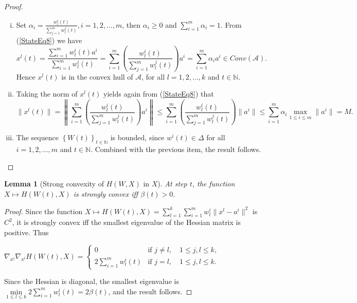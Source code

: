 \documentclass[11pt]{article}
\numberwithin{equation}{section}
\newtheorem{lemma}{Lemma}[proposition]
\begin{document}
\begin{proof}
\begin{enumerate}[(i)]
	\item  Set $\alpha_i = \frac{ w^i_l(t)}{\sum_{j=1}^{m} w^j_l(t)}, i=1, 2, \ldots ,m$, then $\alpha_i \geq 0$ and $\sum\limits_{i=1}^{m} \alpha_i =1$. From (\ref{StateEq8}) we have
	\begin{equation*}
		x^l(t) = \frac{\sum_{i=1}^{m} w^i_l(t) a^i}{\sum_{i=1}^{m} w^i_l(t)} 
		= \sum_{i=1}^{m} \left( \frac{ w^i_l(t)}{\sum_{j=1}^{m} w^j_l(t)} \right) a^i 
		= \sum\limits_{i=1}^{m} \alpha_i a^i \in Conv(\mathcal{A}).
	\end{equation*}
	Hence $x^l(t)$ is in the convex hull of $\mathcal{A}$, for all $l = 1, 2, \ldots, k$ and $t \in \mathbb{N}$.

	\item
	Taking the norm of $x^l(t)$ yields again from (\ref{StateEq8}) that
	\begin{equation*}
		\| x^l(t) \| = \left\lVert \sum_{i=1}^{m} \left( \frac{ w^i_l(t)}{\sum_{j=1}^{m} w^j_l(t)} \right) a^i \right\lVert
		\leq \sum_{i=1}^{m} \left( \frac{ w^i_l(t)}{\sum_{j=1}^{m} w^j_l(t)} \right) \| a^i \|
		\leq \sum_{i=1}^{m} \alpha_i \max\limits_{1 \leq i \leq m} \| a^i \| = M .
	\end{equation*}
	\item The sequence $\left\lbrace W(t) \right\rbrace_{t \in \mathbb{N}}$ is bounded, since $w^i(t) \in \Delta$ for all $i=1, 2, \ldots ,m$ and $t \in \mathbb{N}$. Combined with the previous item, the result follows. 
\end{enumerate}
\end{proof}

\begin{lemma}[Strong convexity of $H(W,X)$ in $X$] \label{StateEq14}
At step $t$, the function $X \mapsto H(W(t),X)$ is strongly convex iff $\beta(t) > 0$.
\end{lemma}

\begin{proof}
Since the function $X \mapsto H(W(t),X) = 
\sum\limits_{l=1}^{k} \sum\limits_{i=1}^{m} w^i_l \|x^l - a^i\|^2$ is $C^2$, it is strongly convex iff the smallest eigenvalue of the Hessian matrix is positive. Thus

\begin{center}
$\nabla_{x^j} \nabla_{x^l} H(W(t),X) = 
\begin{cases} 0 &\mbox{if } j \neq l, \quad 1 \leq j,l \leq k ,
\\ 2\sum\limits_{i=1}^{m} w^i_l(t) &\mbox{if } j = l, \quad 1 \leq j,l \leq k. \end{cases} $
\end{center}

Since the Hessian is diagonal, the smallest eigenvalue is $\min\limits_{1 \leq l \leq k} 2\sum\limits_{i=1}^{m} w^i_l(t) = 2\beta(t)$, and the result follows.
\end{proof}
\end{document}
